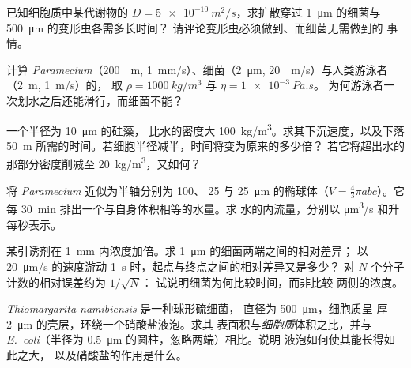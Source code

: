 \begin{exercise}[$\star\star$]\label{exo:b2:unicellular-diversity:5}
已知细胞质中某代谢物的 $D = \qty{5e-10}{m^2/s}$，求扩散穿过
\qty{1}{\micro m} 的细菌与 \qty{500}{\micro m} 的变形虫各需多长时间？
请评论变形虫必须做到、而细菌无需做到的
事情。
\end{exercise}

\begin{exercise}[$\star\star$]\label{exo:b2:unicellular-diversity:6}
计算 \emph{Paramecium}（\qty{200}{\micro
m}, \qty{1}{mm/s}）、细菌（\qty{2}{\micro m}, \qty{20}{\micro
m/s}）与人类游泳者（\qty{2}{m}, \qty{1}{m/s}）的，
取 $\rho = \qty{1000}{kg/m^3}$ 与 $\eta = \qty{1e-3}{Pa.s}$。
为何游泳者一次划水之后还能滑行，而细菌不能？
\end{exercise}

\begin{exercise}[$\star\star$]\label{exo:b2:unicellular-diversity:7}
一个半径为 \qty{10}{\micro m} 的硅藻，
比水的密度大 \qty{100}{kg/m^3}。求其下沉速度，以及下落
\qty{50}{m} 所需的时间。若细胞半径减半，时间将变为原来的多少倍？
若它将超出水的那部分密度削减至 \qty{20}{kg/m^3}，又如何？
\end{exercise}

\begin{exercise}[$\star\star$]\label{exo:b2:unicellular-diversity:8}
将 \emph{Paramecium} 近似为半轴分别为 \num{100}、
\num{25} 与 \qty{25}{\micro m} 的椭球体（$V = \tfrac{4}{3}\pi abc$）。它
每 \qty{30}{min} 排出一个与自身体积相等的水量。求
水的内流量，分别以 \unit{\micro m^3/s} 和升每秒表示。
\end{exercise}

\begin{exercise}[$\star\star$]\label{exo:b2:unicellular-diversity:9}
某引诱剂在 \qty{1}{mm} 内浓度加倍。求
\qty{1}{\micro m} 的细菌两端之间的相对差异；
以 \qty{20}{\micro m/s} 的速度游动 \qty{1}{s} 时，起点与终点之间的相对差异又是多少？
对 $N$ 个分子计数的相对误差约为 $1/\sqrt{N}$：
试说明细菌为何比较时间，而非比较
两侧的浓度。
\end{exercise}

\begin{exercise}[$\star\star\star$]\label{exo:b2:unicellular-diversity:10}
\emph{Thiomargarita namibiensis} 是一种球形硫细菌，
直径为 \qty{500}{\micro m}，细胞质呈
厚 \qty{2}{\micro m} 的壳层，环绕一个硝酸盐液泡。求其
表面积与\emph{细胞质}体积之比，并与
\emph{E.~coli}（半径为 \qty{0.5}{\micro m} 的圆柱，忽略两端）相比。说明
液泡如何使其能长得如此之大，
以及硝酸盐的作用是什么。
\end{exercise}


